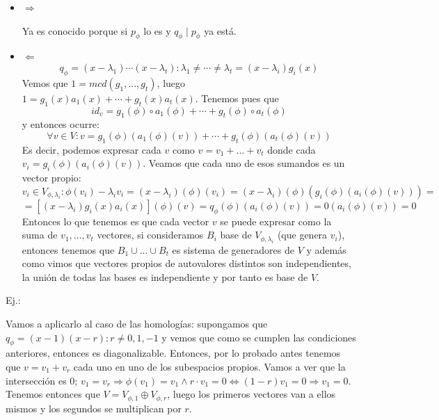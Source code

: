 \documentclass[10pt,a4paper,openright]{book}
\begin{document}
\begin{itemize}
\item $\Rightarrow$

Ya es conocido porque si $p_\phi$ lo es y $q_\phi\mid p_\phi$ ya está.

\item $\Leftarrow$
$$q_\phi=(x-\lambda_1)\cdots (x-\lambda_t): \lambda_1 \neq \cdots \neq \lambda_t= (x-\lambda_i)g_i(x)$$
Vemos que $1=mcd(g_1, ..., g_t)$, luego $1=g_1(x)a_1(x)+\cdots +g_t(x)a_t(x)$. Tenemos pues que
$$id_v=g_1(\phi)\circ a_1(\phi)+\cdots + g_t(\phi)\circ a_t(\phi)$$
y entonces ocurre:
$$\forall v\in V: v=g_1(\phi)(a_1(\phi)(v))+\cdots + g_t(\phi)(a_t(\phi)(v))$$
Es decir, podemos expresar cada $v$ como $v=v_1+...+v_t$ donde cada $v_i=g_i(\phi)(a_i(\phi)(v))$. Veamos que cada uno de esos sumandos es un vector propio:
$$v_i\in V_{\phi, \lambda_i}: \phi(v_i)-\lambda_iv_i= (x-\lambda_i)(\phi)(v_i)= (x-\lambda_i)(\phi)(g_i(\phi)(a_i(\phi)(v)))=$$
$$=[(x-\lambda_i)g_i(x)a_i(x)](\phi)(v)= q_\phi(\phi)(a_i(\phi)(v))=0(a_i(\phi)(v))=0$$
Entonces lo que tenemos es que cada vector $v$ se puede expresar como la suma de $v_1, ..., v_t$ vectores, si consideramos $B_i$ base de $V_{\phi, \lambda_i}$ (que genera $v_i$), entonces tenemos que $B_1\cup ... \cup B_t$ es sistema de generadores de $V$ y además como vimos que vectores propios de autovalores distintos son independientes, la unión de todas las bases es independiente y por tanto es base de $V$.
\end{itemize}

Ej.:

Vamos a aplicarlo al caso de las homologías: supongamos que $q_\phi=(x-1)(x-r): r\neq 0,1,-1$ y vemos que como se cumplen las condiciones anteriores, entonces es diagonalizable. Entonces, por lo probado antes tenemos que $v=v_1+v_r$ cada uno en uno de los subespacios propios. Vamos a ver que la intersección es 0; $v_1=v_r\Rightarrow \phi(v_1)=v_1 \wedge r\cdot v_1=0\Leftrightarrow (1-r)v_1=0\Rightarrow v_1 = 0$. Tenemos entonces que $V=V_{\phi, 1} \oplus V_{\phi,r}$, luego los primeros vectores van a ellos mismos y los segundos se multiplican por $r$.
\end{document}
